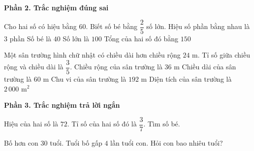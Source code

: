 \textbf{Phần 2. Trắc nghiệm đúng sai}

\begin{ex} %
Cho hai số có hiệu bằng $60$. Biết số bé bằng $\dfrac{2}{5}$ số lớn.
\choiceTF
{\True Hiệu số phần bằng nhau là $3$ phần}
{\True Số bé là $40$}
{\True Số lớn là $100$}
{Tổng của hai số đó bằng $150$}
\end{ex}

\begin{ex} %
Một sân trường hình chữ nhật có chiều dài hơn chiều rộng $24\text{ m}$. Tỉ số giữa chiều rộng và chiều dài là $\dfrac{3}{5}$.
\choiceTF
{\True Chiều rộng của sân trường là $36\text{ m}$}
{\True Chiều dài của sân trường là $60\text{ m}$}
{\True Chu vi của sân trường là $192\text{ m}$}
{Diện tích của sân trường là $2\,000\text{ m}^2$}
\end{ex}

\textbf{Phần 3. Trắc nghiệm trả lời ngắn}

\begin{ex} %
Hiệu của hai số là $72$. Tỉ số của hai số đó là $\dfrac{3}{7}$. Tìm số bé.
\end{ex}

\begin{ex} %
Bố hơn con $30$ tuổi. Tuổi bố gấp $4$ lần tuổi con. Hỏi con bao nhiêu tuổi?
\end{ex}

